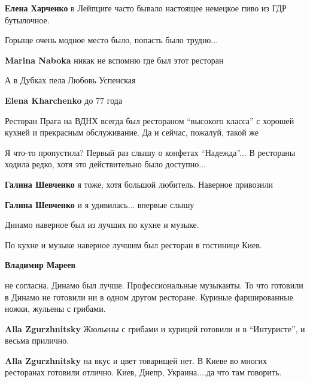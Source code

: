 \begin{itemize}
\begin{itemize} %
\textbf{Елена Харченко} в Лейпциге часто бывало настоящее немецкое пиво из ГДР бутылочное.

Горыще очень модное место было, попасть было трудно...

\textbf{Marina Naboka} никак не вспомню где был этот ресторан

А в Дубках пела Любовь Успенская

\textbf{Elena Kharchenko} до 77 года


Ресторан Прага на ВДНХ всегда был рестораном \enquote{высокого класса} с
хорошей кухней и прекрасным обслуживание. Да и сейчас, пожалуй, такой же

\end{itemize} %


Я что-то пропустила? Первый раз слышу о конфетах \enquote{Надежда}... В рестораны
ходила редко, хотя это действительно было доступно...

\begin{itemize} %
\textbf{Галина Шевченко} я тоже, хотя большой любитель. Наверное привозили

\textbf{Галина Шевченко} и я удивилась... впервые слышу
\end{itemize} %

Динамо наверное был из лучших по кухне и музыке.

\begin{itemize} %

По кухне и музыке наверное лучшим был ресторан в гостинице Киев.

\begin{itemize} %
\textbf{Владимир Мареев} 

не согласна. Динамо был лучше. Профессиональные музыканты. То что готовили в
Динамо не готовили ни в одном другом ресторане. Куриные фаршированные ножки,
жульены с грибами.


\textbf{Alla Zgurzhnitsky} Жюльены с грибами и курицей готовили и в \enquote{Интуристе}, и весьма прилично.

\textbf{Alla Zgurzhnitsky} на вкус и цвет товарищей нет. В Киеве во многих ресторанах готовили отлично. Киев, Днепр, Украина....да что там говорить.


\end{itemize}
\end{itemize}
\end{itemize}
